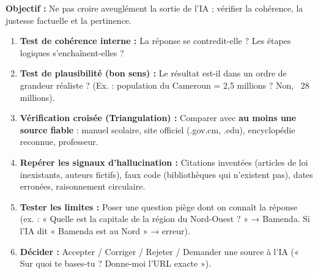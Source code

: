 \documentclass[11pt]{article}
\begin{document}
\begin{methode}
\textbf{Objectif :} Ne pas croire aveuglément la sortie de l'IA ; vérifier la cohérence, la justesse factuelle et la pertinence.
\begin{enumerate}
    \item \textbf{Test de cohérence interne :} La réponse se contredit-elle ? Les étapes logiques s'enchaînent-elles ?
    \item \textbf{Test de plausibilité (bon sens) :} Le résultat est-il dans un ordre de grandeur réaliste ? (Ex. : population du Cameroun = 2,5 millions ? Non, ~28 millions).
    \item \textbf{Vérification croisée (Triangulation) :} Comparer avec \textbf{au moins une source fiable} : manuel scolaire, site officiel (.gov.cm, .edu), encyclopédie reconnue, professeur.
    \item \textbf{Repérer les signaux d'hallucination :} Citations inventées (articles de loi inexistants, auteurs fictifs), faux code (bibliothèques qui n'existent pas), dates erronées, raisonnement circulaire.
    \item \textbf{Tester les limites :} Poser une question piège dont on connaît la réponse (ex. : « Quelle est la capitale de la région du Nord-Ouest ? » → Bamenda. Si l'IA dit « Bamenda est au Nord » → erreur).
    \item \textbf{Décider :} Accepter / Corriger / Rejeter / Demander une source à l'IA (« Sur quoi te bases-tu ? Donne-moi l'URL exacte »).
\end{enumerate}
\end{methode}
\end{document}

